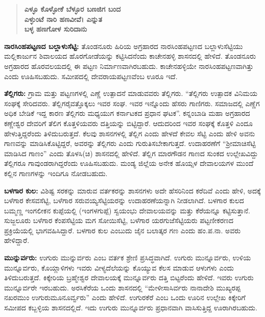 \begin{verse}
\textbf{ಎಳ್ಳೂ ಕೊಳ್ಳೋಕೆ ಬೆಳ್ಳೂರ ಬಣಜಿಗ ಬಂದ} \\\textbf{ಎಳ್ಳುಂಟೆ ನಾರಿ ಹಣವೀವೆ। ಎನ್ನುತ} \\\textbf{ಬಳ್ಳ ಹಣಗೋಳ ಸುರಿದಾನು}
\end{verse}

\textbf{ನಾರಸಿಂಹಪಟ್ಟಣದ ಬಲ್ಲಾಳುಸೆಟ್ಟಿ: } ತೊಂಡನೂರು ಹಿರಿಯ ಅಗ್ರಹಾರದ ನಾರಸಿಂಹಪಟ್ಟಣದ ಬಲ್ಲಾಳುಸೆಟ್ಟಿಯು ಮಲ್ಲಿಕಾರ್ಜುನ ಶಿವಾಲಯದ ಹೊರಗೋಡೆಯನ್ನು ಕಟ್ಟಿಸಿದನೆಂದು ಕಾಚೇನಹಳ್ಳಿ ಶಾಸನದಲ್ಲಿ ಹೇಳಿದೆ. ತೊಂಡನೂರು ಅಗ್ರಹಾರದ ಹೊರವಲಯದಲ್ಲಿ ಈ ಪಟ್ಟಣ ನಿರ್ಮಾಣವಾಗಿರಬಹುದು. ಕಾಚೇನಹಳ್ಳಿಯೇ ನಾರಸಿಂಹಪಟ್ಟಣವಾಗಿತ್ತು ಎಂದು ಊಹಿಸಬಹುದು. ಸಮೀಪದಲ್ಲಿ ದೇವರಾಯಪಟ್ಟಣವೆಂಬ ಊರೂ ಇದೆ.

\textbf{ತೆಲ್ಲಿಗರು:} ಗ್ರಾಮ ಮತ್ತು ಪಟ್ಟಣಗಳಲ್ಲಿ ಎಣ್ಣೆ ಉತ್ಪಾದನೆ ಮಾಡುವವರು ತೆಲ್ಲಿಗರು. “ತೆಲ್ಲಿಗರು ಉತ್ಪಾದಕ ವಿನಿಮಯ ಸಂಘಕ್ಕೆ ಸೇರಿದವರು. ತೆಲ್ಲಿಗರೈವತ್ತೊಕ್ಕಲು ಇವರ ಸಂಘ. ಇವರ ಇನ್ನೊಂದು ಹೆಸರು ಗಾಣಿಗರು. ಸಮಾಜದಲ್ಲಿ ಎಣ್ಣೆಗ ಅಧಿಕ ಬೇಡಿಕೆ ಇದ್ದ ಕಾರಣ ತೆಲ್ಲಿಗರು ಮಧ್ಯಯುಗ ಕರ್ನಾಟಕದ ಪ್ರಧಾನ ಘಟಕ”. ಕನ್ನಂಬಾಡಿ ಮಹಾ ಅಗ್ರಹಾರದ ಕಣ್ಣೇಶ್ವರ ದೇವರಿಗೆ ತೆಲಿಗ ಕೊತ್ತಳಿಯವರು ದತ್ತಿಯನ್ನು ಬಿಟ್ಟಿದ್ದಾರೆ. ಆದುದರಿಂದ ಇವರ ಸಂಘಕ್ಕೆ ಕೊತ್ತಳಿ ಎಂದೂ ಹೇಳುತ್ತಿದ್ದರೆಂದು ತಿಳಿದುಬರುತ್ತದೆ. ಕೆಲವು ಶಾಸನಗಳಲ್ಲಿ ತೆಲ್ಲಿಗ ಎಂದು ಹೇಳದೆ ಕೇವಲ ಸೆಟ್ಟಿ ಎಂದು ಹೇಳಿ ಅವನು ಗಾಣವನ್ನು ಮಾಡಿಸಿಕೊಟ್ಟಿದ್ದರೆ, ಅವರನ್ನು ತೆಲ್ಲಿಗರು ಎಂದು ಗುರುತಿಸಬೇಕಾಗುತ್ತದೆ. ಉದಾಹರಣೆಗೆ “ಶ‍್ರೀಮಾಚಿಸೆಟ್ಟಿ ಮಾಡಿಸಿದ ಗಾಣಂ” ಎಂದು ತೊಳಸಿ(ಚಿ) ಶಾಸನದಲ್ಲಿ ಹೇಳಿದೆ. ತೆಲ್ಲಿಗ ಮಾರಗೌಡನ ಗಾಣದ ಸುಂಕದ ಉಲ್ಲೇಖವಿದ್ದು ತೆಲ್ಲಿಗರೂ ಗಾವುಂಡರಾಗಿದ್ದರೆಂದು ಊಹಿಸಬಹುದು. ಮಂಡ್ಯ ಜಿಲ್ಲೆಯ ಅನೇಕ ಹೊಯ್ಸಳ ದೇವಾಲಯಗಳ ಮುಂದೆ ಕಲ್ಲಿನ ಗಾಣಗಳನ್ನು ಇಂದಿಗೂ ನೋಡಬಹುದು.

\textbf{ಬಳಗಾರ ಕುಲ:} ವಿಶಿಷ್ಟ ಸರಕನ್ನು ಮಾರುವ ವರ್ತಕರನ್ನು ಶಾಸನಗಳು ಅದೇ ಹೆಸರಿನಿಂದ ಕರೆದಿವೆ ಎಂದು ಹೇಳಿ, ಅದಕ್ಕೆ ಬಳೆಗಾರ ಕೇಸವಸೆಟ್ಟಿ, ಬಳೆಗಾರ ಸರುವಯ್ಯಸೆಟ್ಟಿಯರನ್ನು ಉದಾಹರಣೆಯನ್ನಾಗಿ ನೀಡಲಾಗಿದೆ. ಬಳಗಾರ ಕುಲದ ಬಮ್ಮಣ್ಣ ಇಂಗಲೀಕನ ಕುಪ್ಪೆಯಲ್ಲಿ (ಇಂಗಳಗುಪ್ಪೆ) ಸ್ವಯಂಭು ದೇವಾಲಯವನ್ನು ಮತ್ತು ಕೆರೆಯನ್ನೂ ಕಟ್ಟಿಸುತ್ತಾನೆ. ಸುಜ್ಜಲೂರು ಬಳೆಗಾರ ಕೆಂಪಸೆಟ್ಟಿಯ ಮಗ ಸೋಯಿಸೆಟ್ಟಿ, ಬಳೆಗಾರ ಯರಗುಜೆಸೆಟ್ಟಿಯರು ಪಟ್ಟಣೀಕರಣದ ಪ್ರಕ್ರಿಯೆಯಲ್ಲಿ ಭಾಗವಹಿಸಿದ್ದಾರೆ. ಬಳಗಾರ ಕುಲ ಎಂಬುದು ಜೈನ ಬಲಾತ್ಕರ ಗಣ ಎಂದು ಹಂ.ಪ.ನಾ. ಅವರು ಹೇಳಿದ್ದಾರೆ.

\textbf{ಮುನ್ನುರ್ವರು: } ಉಗುರು ಮುನ್ನುರ್ವರು ಎಂಬ ವರ್ತಕ ಶ್ರೇಣಿ ಪ್ರಸಿದ್ಧವಾಗಿದೆ. ಉಗುರು ಮುನ್ನೂರ್ವರು, ಉಳಿಯ ಮುನ್ನೂರ್ವರು, ಕೊಯ್ಲಾಳಿಗಳು ಇವರು ವೀಳ್ಯದೆಲೆಯನ್ನು ಕೊಯ್ಯುವ ಕೆಲಸ ಮಾಡುವ ಆಳುಗಳು ಎಂದು ತಿಳಿದುಬರುತ್ತದೆ. ಕಿಕ್ಕೇರಿಯ ಬ್ರಹ್ಮೇಶ್ವರ ದೇವಾಲಯಕ್ಕೆ ಮುನ್ನೂರ್ವರು ದತ್ತಿ ಬಿಟ್ಟರೆಂದು ಹೇಳಿದೆ. ಇವರು ಉಗುರು ಮುನ್ನೂರ್ವರೇ ಇರಬಹುದು. ಅರಸಿಕೆರೆಯ ಒಂದು ಶಾಸನದಲ್ಲಿ “ಮೇಳೀಸಾಸಿರ್ವರು ನಾನಾದೇಶಿ ಮುಖ್ಯರಪ್ಪ ನಖರಮುಂ ಉಗುರುಮೂನೂರ್ವ್ವರು” ಎಂದು ಹೇಳಿದೆ. ಉಗುರಕೆರೆ ಎಂಬ ಒಂದು ಊರಿನ ಉಲ್ಲೇಖ ಕಿಕ್ಕೇರಿಗೆ ಸಮೀಪದ ಕಬ್ಬಳ್ಳಿಯ ಶಾಸನದಲ್ಲಿದೆ. ಇದು ಉಗುರು ಮುನ್ನೂರ್ವರು ಪ್ರಧಾನವಾಗಿ ವಾಸಿಸುತ್ತಿದ್ದ ಊರಾಗಿರಬಹುದು.

